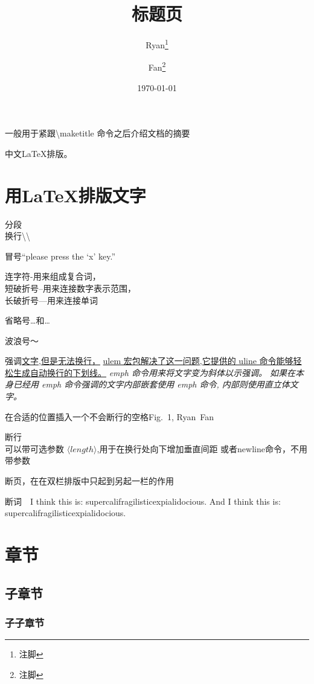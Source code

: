 \documentclass[a4paper]{ctexart}
\begin{document}
    \title{标题页}
    \author{Ryan\thanks{注脚}%
        \and Fan\thanks{注脚}%
        }
    \date{\today}
    \maketitle
    \abstract
    一般用于紧跟\textbackslash maketitle 命令之后介绍文档的摘要\par
    中文\LaTeX{}排版。
    \section{用\LaTeX 排版文字}
    {}分段\\换行\textbackslash\textbackslash\par
    冒号``please press the `x' key.''\par
    连字符-用来组成复合词，\\%
    短破折号--用来连接数字表示范围，\\%
    长破折号---用来连接单词\par
    省略号\dots{}和\ldots\par
    波浪号～\par
    强调\underline{文字,但是无法换行，}%
    \uline{ulem 宏包解决了这一问题,它提供的 uline 命令能够轻松生成自动换行的下划线。}%
    \emph{emph 命令用来将文字变为斜体以示强调。%
        \emph{如果在本身已经用 emph 命令强调的文字内部嵌套使用 emph 命令,}%
        内部则使用直立体文字。%
        }\par
    在合适的位置插入一个不会断行的空格Fig.~1, Ryan~Fan\par
    断行\\[15pt]可以带可选参数 $\langle length\rangle$,用于在换行处向下增加垂直间距%
    \newline{}或者newline命令，不用带参数\par
    \newpage 断页，在在双栏排版中只起到另起一栏的作用\par
    断词　I think this is: supercalifragil\-isticexpialidocious. %
    And I think this is: supercalifragilisticexpialidocious.\par
    \newpage
    \tableofcontents
    \newpage
    \section[目录和页眉页脚]{章节}
    \subsection{子章节}
    \subsubsection{子子章节}
\end{document}
